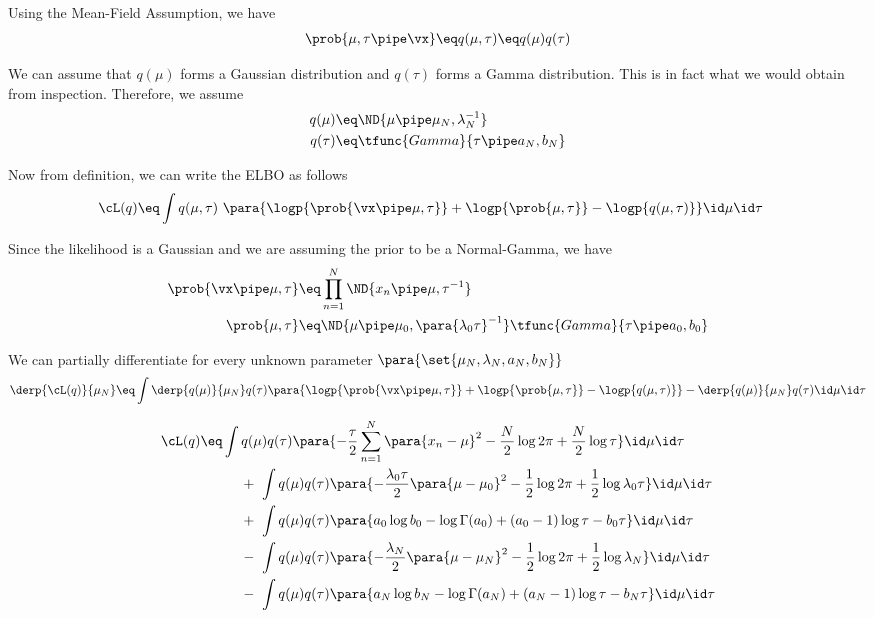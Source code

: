 \documentclass{article}
\begin{document}
\begin{question}

	Using the Mean-Field Assumption, we have
	\begin{align*}
		\prob{\mu, \tau \pipe \vx}	\eq	q(\mu, \tau)	\eq	q(\mu) q(\tau)
	\end{align*}

	We can assume that $q(\mu)$ forms a Gaussian distribution and $q(\tau)$ forms a Gamma distribution. This is in fact what we would obtain from inspection. Therefore, we assume
	\begin{align*}
		q(\mu)	&\eq	\ND{\mu \pipe \mu_N, \lambda_N^{-1}} \\
		q(\tau)	&\eq	\tfunc{Gamma}{\tau \pipe a_N, b_N}
	\end{align*}

	Now from definition, we can write the ELBO as follows
	\begin{align*}
		\cL(q)	&\eq	\int q(\mu, \tau)\ \para{\logp{\prob{\vx \pipe \mu, \tau}} + \logp{\prob{\mu, \tau}} - \logp{q(\mu, \tau)}} \id \mu \id \tau
	\end{align*}

	Since the likelihood is a Gaussian and we are assuming the prior to be a Normal-Gamma, we have
	\begin{align*}
		\prob{\vx \pipe \mu, \tau}	&\eq	\prod_{n = 1}^N \ND{x_n \pipe \mu, \tau^{-1}} \\
		\prob{\mu, \tau}	&\eq	\ND{\mu \pipe \mu_0, \para{\lambda_0 \tau}^{-1}} \tfunc{Gamma}{\tau \pipe a_0, b_0}
	\end{align*}

	We can partially differentiate for every unknown parameter $\para{\set{\mu_N, \lambda_N, a_N, b_N}}$
	\begin{align*}
		\derp{\cL(q)}{\mu_N}	\eq	\int \derp{q(\mu)}{\mu_N} q(\tau) \para{\logp{\prob{\vx \pipe \mu, \tau}} + \logp{\prob{\mu, \tau}} - \logp{q(\mu, \tau)}} - \derp{q(\mu)}{\mu_N} q(\tau) \id \mu \id \tau
	\end{align*}

	\begin{align*}
	\cL(q)	&\eq	\int q(\mu) q(\tau) \para{- \frac{\tau}{2} \sum_{n = 1}^N \para{x_n - \mu}^2 - \frac{N}{2} \log{2 \pi} + \frac{N}{2} \log{\tau}} \id \mu \id \tau \\
	&\hspace{1cm} + \ \int q(\mu) q(\tau) \para{- \frac{\lambda_0 \tau}{2} \para{\mu - \mu_0}^2 - \frac{1}{2} \log{2 \pi} + \frac{1}{2} \log{\lambda_0 \tau}} \id \mu \id \tau \\
	&\hspace{1cm} + \ \int q(\mu) q(\tau) \para{a_0 \log{b_0} - \log{\Gamma(a_0)} + (a_0 - 1) \log{\tau} - b_0 \tau} \id \mu \id \tau \\
	&\hspace{1cm} - \ \int q(\mu) q(\tau) \para{- \frac{\lambda_N}{2} \para{\mu - \mu_N}^2 - \frac{1}{2} \log{2 \pi} + \frac{1}{2} \log{\lambda_N}} \id \mu \id \tau \\
	&\hspace{1cm} - \ \int q(\mu) q(\tau) \para{a_N \log{b_N} - \log{\Gamma(a_N)} + (a_N - 1) \log{\tau} - b_N \tau} \id \mu \id \tau
	\end{align*}


\end{question}
\end{document}

